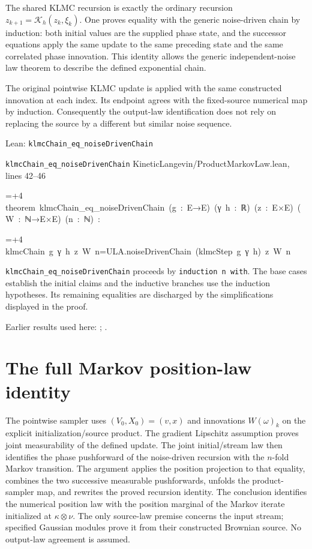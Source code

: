 \documentclass[11pt,a4paper]{article}
\newlength{\leancharwidth}
\newenvironment{leancode}{\par\smallskip\begingroup\ttfamily\footnotesize\raggedright
  \settowidth{\leancharwidth}{M}\setlength{\parskip}{0pt}\setlength{\parindent}{0pt}
  \frenchspacing}{\par\endgroup\smallskip}
\newcommand{\leanline}[2]{\hangindent=\dimexpr#1\leancharwidth+4\leancharwidth\relax
  \hangafter=1\noindent\hspace*{#1\leancharwidth}#2\par}
\newcommand{\leansource}[1]{\par{\footnotesize\color{leanmuted}#1}\par}
\newcommand{\leanlabel}[1]{\par\smallskip\noindent{\small\bfseries #1}\par}
\begin{document}
The shared KLMC recursion is exactly the ordinary recursion \(z_{k+1}=\mathcal K_h(z_k,\xi_k)\). One proves equality with the generic noise-driven chain by induction: both initial values are the supplied phase state, and the successor equations apply the same update to the same preceding state and the same correlated phase innovation. This identity allows the generic independent-noise law theorem to describe the defined exponential chain.



The original pointwise KLMC update is applied with the same constructed innovation at each index. Its endpoint agrees with the fixed-source numerical map by induction. Consequently the output-law identification does not rely on replacing the source by a different but similar noise sequence.

\begin{leanbox}{Lean: \texttt{klmcChain\_\allowbreak{}eq\_\allowbreak{}noiseDrivenChain}}
\leansource{\texttt{klmcChain\_\allowbreak{}eq\_\allowbreak{}noiseDrivenChain} \quad KineticLangevin/\allowbreak{}ProductMarkovLaw.lean, lines 42–46}
\begin{leancode}
\leanline{0}{theorem\ klmcChain\_eq\_noiseDrivenChain\ (g\ :\ E→E)\ (γ\ h\ :\ ℝ)\ (z\ :\ E×E)\ (W\ :\ ℕ→E×E)\ (n\ :\ ℕ)\ :}
\leanline{4}{klmcChain\ g\ γ\ h\ z\ W\ n=ULA.noiseDrivenChain\ (klmcStep\ g\ γ\ h)\ z\ W\ n}
\end{leancode}
\leanlabel{How the Lean proof follows the argument}
\texttt{klmc\allowbreak{}Chain\_\allowbreak{}eq\_\allowbreak{}noise\allowbreak{}Driven\allowbreak{}Chain} proceeds by \texttt{induction n with}. The base cases establish the initial claims and the inductive branches use the induction hypotheses. Its remaining equalities are discharged by the simplifications displayed in the proof.
\end{leanbox}


Earlier results used here: \cite[Section~3.20.1]{LangevinLean2026ULASC}; \cite[Section~3.20.3]{LangevinLean2026ULASC}.

\section{\texorpdfstring{The full Markov position-law identity}{The full Markov position-law identity}}


The pointwise sampler uses \((V_0,X_0)=(v,x)\) and innovations \(W(\omega)_k\) on the explicit initialization/\allowbreak{}source product. The gradient Lipschitz assumption proves joint measurability of the defined update. The joint initial/\allowbreak{}stream law then identifies the phase pushforward of the noise-driven recursion with the \(n\)-fold Markov transition. The argument applies the position projection to that equality, combines the two successive measurable pushforwards, unfolds the product-sampler map, and rewrites the proved recursion identity. The conclusion identifies the numerical position law with the position marginal of the Markov iterate initialized at \(\kappa\otimes\nu\). The only source-law premise concerns the input stream; specified Gaussian modules prove it from their constructed Brownian source. No output-law agreement is assumed.
\end{document}
